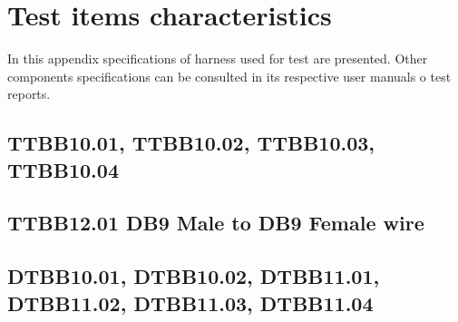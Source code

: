 \section{Test items characteristics} \label{an:items-list}

In this appendix specifications of harness used for test are presented. Other components specifications can be consulted in its respective user manuals o test reports.\\



\subsection{TTBB10.01, TTBB10.02, TTBB10.03, TTBB10.04 \fsHarness}


\subsection{TTBB12.01 DB9 Male to DB9 Female wire}

  
\subsection{DTBB10.01, DTBB10.02, DTBB11.01, DTBB11.02, DTBB11.03, DTBB11.04 \datHarness}


